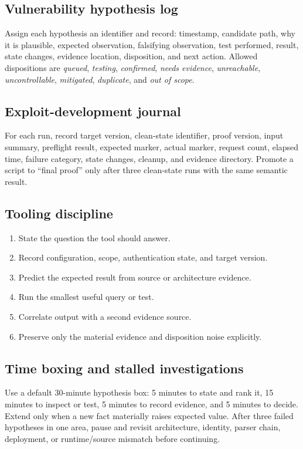 \documentclass[11pt]{article}
\begin{document}
\subsection{Vulnerability hypothesis log}
Assign each hypothesis an identifier and record: timestamp, candidate path, why it
is plausible, expected observation, falsifying observation, test performed, result,
state changes, evidence location, disposition, and next action. Allowed dispositions
are \emph{queued}, \emph{testing}, \emph{confirmed}, \emph{needs evidence},
\emph{unreachable}, \emph{uncontrollable}, \emph{mitigated}, \emph{duplicate},
and \emph{out of scope}.

\subsection{Exploit-development journal}
For each run, record target version, clean-state identifier, proof version, input
summary, preflight result, expected marker, actual marker, request count, elapsed
time, failure category, state changes, cleanup, and evidence directory. Promote a
script to ``final proof'' only after three clean-state runs with the same semantic
result.

\subsection{Tooling discipline}
\begin{enumerate}
  \item State the question the tool should answer.
  \item Record configuration, scope, authentication state, and target version.
  \item Predict the expected result from source or architecture evidence.
  \item Run the smallest useful query or test.
  \item Correlate output with a second evidence source.
  \item Preserve only the material evidence and disposition noise explicitly.
\end{enumerate}

\subsection{Time boxing and stalled investigations}
Use a default 30-minute hypothesis box: 5 minutes to state and rank it, 15 minutes
to inspect or test, 5 minutes to record evidence, and 5 minutes to decide. Extend
only when a new fact materially raises expected value. After three failed
hypotheses in one area, pause and revisit architecture, identity, parser chain,
deployment, or runtime/source mismatch before continuing.
\end{document}
